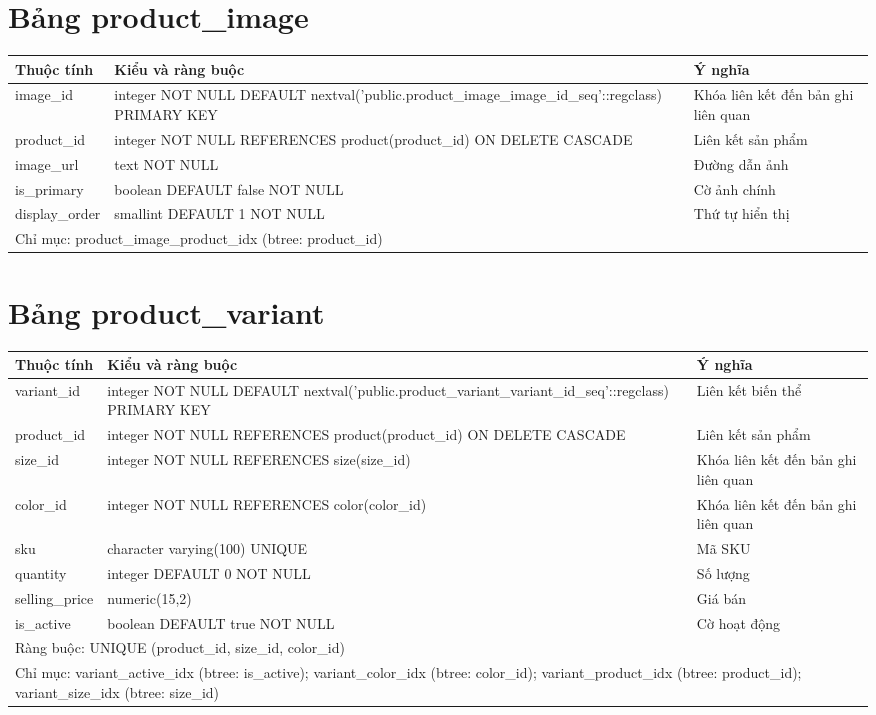\section{Bảng product\_image}
\begin{longtable}{|p{}|p{}|p{}|}\hline
\textbf{Thuộc tính}&\textbf{Kiểu và ràng buộc}&\textbf{Ý nghĩa}\\\hline\endhead
image\_id & integer NOT NULL DEFAULT nextval('public.product\_image\_image\_id\_seq'::regclass) PRIMARY KEY & Khóa liên kết đến bản ghi liên quan\\\hline
product\_id & integer NOT NULL REFERENCES product(product\_id) ON DELETE CASCADE & Liên kết sản phẩm\\\hline
image\_url & text NOT NULL & Đường dẫn ảnh\\\hline
is\_primary & boolean DEFAULT false NOT NULL & Cờ ảnh chính\\\hline
display\_order & smallint DEFAULT 1 NOT NULL & Thứ tự hiển thị\\\hline
\multicolumn{3}{|p{0.93\textwidth}|}{Chỉ mục: product\_image\_product\_idx (btree: product\_id)}\\\hline
\end{longtable}
\normalsize
\section{Bảng product\_variant}
\begin{longtable}{|p{}|p{}|p{}|}\hline
\textbf{Thuộc tính}&\textbf{Kiểu và ràng buộc}&\textbf{Ý nghĩa}\\\hline\endhead
variant\_id & integer NOT NULL DEFAULT nextval('public.product\_variant\_variant\_id\_seq'::regclass) PRIMARY KEY & Liên kết biến thể\\\hline
product\_id & integer NOT NULL REFERENCES product(product\_id) ON DELETE CASCADE & Liên kết sản phẩm\\\hline
size\_id & integer NOT NULL REFERENCES size(size\_id) & Khóa liên kết đến bản ghi liên quan\\\hline
color\_id & integer NOT NULL REFERENCES color(color\_id) & Khóa liên kết đến bản ghi liên quan\\\hline
sku & character varying(100) UNIQUE & Mã SKU\\\hline
quantity & integer DEFAULT 0 NOT NULL & Số lượng\\\hline
selling\_price & numeric(15,2) & Giá bán\\\hline
is\_active & boolean DEFAULT true NOT NULL & Cờ hoạt động\\\hline
\multicolumn{3}{|p{0.93\textwidth}|}{Ràng buộc: UNIQUE (product\_id, size\_id, color\_id)}\\\hline
\multicolumn{3}{|p{0.93\textwidth}|}{Chỉ mục: variant\_active\_idx (btree: is\_active); variant\_color\_idx (btree: color\_id); variant\_product\_idx (btree: product\_id); variant\_size\_idx (btree: size\_id)}\\\hline
\end{longtable}
\normalsize
